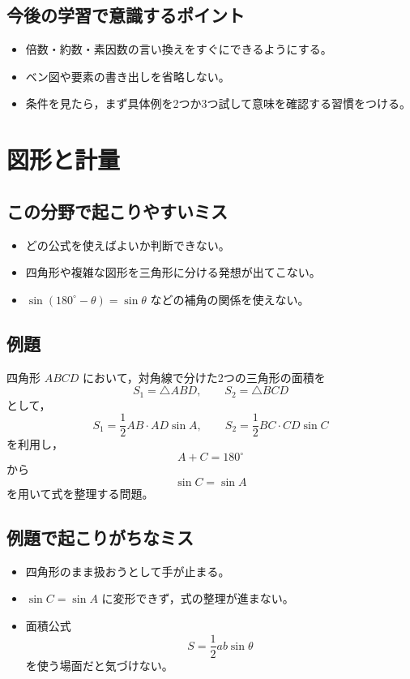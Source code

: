 \subsection*{今後の学習で意識するポイント}
\begin{itemize}
  \item 倍数・約数・素因数の言い換えをすぐにできるようにする。
  \item ベン図や要素の書き出しを省略しない。
  \item 条件を見たら，まず具体例を2つか3つ試して意味を確認する習慣をつける。
\end{itemize}

\bigskip

\section*{図形と計量}

\subsection*{この分野で起こりやすいミス}
\begin{itemize}
  \item どの公式を使えばよいか判断できない。
  \item 四角形や複雑な図形を三角形に分ける発想が出てこない。
  \item $\sin(180^\circ-\theta)=\sin\theta$ などの補角の関係を使えない。
\end{itemize}

\subsection*{例題}
四角形 $ABCD$ において，対角線で分けた2つの三角形の面積を
\[
S_1=\triangle ABD,\qquad S_2=\triangle BCD
\]
として，
\[
S_1=\frac12 AB\cdot AD\sin A,\qquad
S_2=\frac12 BC\cdot CD\sin C
\]
を利用し，
\[
A+C=180^\circ
\]
から
\[
\sin C=\sin A
\]
を用いて式を整理する問題。

\subsection*{例題で起こりがちなミス}
\begin{itemize}
  \item 四角形のまま扱おうとして手が止まる。
  \item $\sin C=\sin A$ に変形できず，式の整理が進まない。
  \item 面積公式
  \[
  S=\frac12 ab\sin\theta
  \]
  を使う場面だと気づけない。
\end{itemize}

